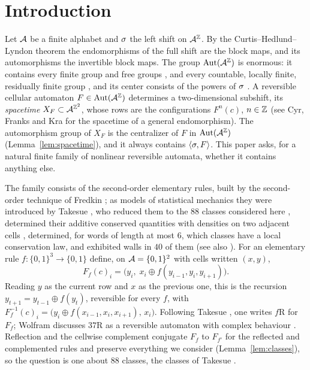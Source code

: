 \section{Introduction}\label{sec:intro}

Let $\mathcal{A}$ be a finite alphabet and $\sigma$ the left shift on $\mathcal{A}^{\mathbb{Z}}$. By the Curtis--Hedlund--Lyndon theorem \cite{Hedlund1969} the endomorphisms of the full shift are the block maps, and its automorphisms the invertible block maps. The group $\operatorname{Aut}(\mathcal{A}^{\mathbb{Z}})$ is enormous: it contains every finite group and free groups \cite{BLR1988}, and every countable, locally finite, residually finite group \cite[Theorem~3.1]{KimRoush1990}, and its center consists of the powers of $\sigma$ \cite{Ryan1972}. A reversible cellular automaton $F\in\operatorname{Aut}(\mathcal{A}^{\mathbb{Z}})$ determines a two-dimensional subshift, its \emph{spacetime} $X_F\subset\mathcal{A}^{\mathbb{Z}^2}$, whose rows are the configurations $F^n(c)$, $n\in\mathbb{Z}$ (see Cyr, Franks and Kra \cite{CFK2019} for the spacetime of a general endomorphism). The automorphism group of $X_F$ is the centralizer of $F$ in $\operatorname{Aut}(\mathcal{A}^{\mathbb{Z}})$ (Lemma~\ref{lem:spacetime}), and it always contains $\langle\sigma,F\rangle$. This paper asks, for a natural finite family of nonlinear reversible automata, whether it contains anything else.

The family consists of the second-order elementary rules, built by the second-order technique of Fredkin \cite{Margolus1984,TM1990,Wolfram2002}; as models of statistical mechanics they were introduced by Takesue \cite{Takesue1987,Takesue1989}, who reduced them to the $88$ classes considered here \cite[Table~I]{Takesue1989}, determined their additive conserved quantities with densities on two adjacent cells \cite[Table~II]{Takesue1989}, determined, for words of length at most $6$, which classes have a local conservation law, and exhibited walls in $40$ of them \cite[Section~4, Fig.~2, Table~III]{Takesue1989} (see also \cite{HT1991,Takesue1995}). For an elementary rule $f\colon\{0,1\}^3\to\{0,1\}$ define, on $\mathcal{A}=\{0,1\}^2$ with cells written $(x,y)$,
\begin{equation}\label{eq:F}
F_f(c)_i=\bigl(y_i,\;x_i\oplus f(y_{i-1},y_i,y_{i+1})\bigr).
\end{equation}
Reading $y$ as the current row and $x$ as the previous one, this is the recursion $y_{t+1}=y_{t-1}\oplus f(y_t)$, reversible for every $f$, with $F_f^{-1}(c)_i=\bigl(y_i\oplus f(x_{i-1},x_i,x_{i+1}),\,x_i\bigr)$. Following Takesue \cite{Takesue1987}, one writes $f$R for $F_f$; Wolfram discusses $37$R as a reversible automaton with complex behaviour \cite[pp.~452--457]{Wolfram2002}. Reflection and the cellwise complement conjugate $F_f$ to $F_{f'}$ for the reflected and complemented rules and preserve everything we consider (Lemma~\ref{lem:classes}), so the question is one about $88$ classes, the classes of Takesue \cite[Table~I]{Takesue1989}.

